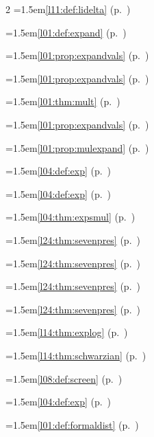 \begin{multicols}{2}
\hangindent=1.5em\quad \ref{l11:def:lidelta} (p.~\pageref{l11:def:lidelta})\par
\hangindent=1.5em\quad \ref{l01:def:expand} (p.~\pageref{l01:def:expand})\par
\hangindent=1.5em\quad \ref{l01:prop:expandvals} (p.~\pageref{l01:prop:expandvals})\par
\hangindent=1.5em\quad \ref{l01:prop:expandvals} (p.~\pageref{l01:prop:expandvals})\par
\hangindent=1.5em\quad \ref{l01:thm:mult} (p.~\pageref{l01:thm:mult})\par
\hangindent=1.5em\quad \ref{l01:prop:expandvals} (p.~\pageref{l01:prop:expandvals})\par
\hangindent=1.5em\quad \ref{l01:prop:mulexpand} (p.~\pageref{l01:prop:mulexpand})\par
\hangindent=1.5em\quad \ref{l04:def:exp} (p.~\pageref{l04:def:exp})\par
\hangindent=1.5em\quad \ref{l04:def:exp} (p.~\pageref{l04:def:exp})\par
\hangindent=1.5em\quad \ref{l04:thm:expsmul} (p.~\pageref{l04:thm:expsmul})\par
\hangindent=1.5em\quad \ref{l24:thm:sevenpres} (p.~\pageref{l24:thm:sevenpres})\par
\hangindent=1.5em\quad \ref{l24:thm:sevenpres} (p.~\pageref{l24:thm:sevenpres})\par
\hangindent=1.5em\quad \ref{l24:thm:sevenpres} (p.~\pageref{l24:thm:sevenpres})\par
\hangindent=1.5em\quad \ref{l24:thm:sevenpres} (p.~\pageref{l24:thm:sevenpres})\par
\hangindent=1.5em\quad \ref{l14:thm:explog} (p.~\pageref{l14:thm:explog})\par
\hangindent=1.5em\quad \ref{l14:thm:schwarzian} (p.~\pageref{l14:thm:schwarzian})\par
\hangindent=1.5em\quad \ref{l08:def:screen} (p.~\pageref{l08:def:screen})\par
\hangindent=1.5em\quad \ref{l04:def:exp} (p.~\pageref{l04:def:exp})\par
\hangindent=1.5em\quad \ref{l01:def:formaldist} (p.~\pageref{l01:def:formaldist})\par

\end{multicols}
